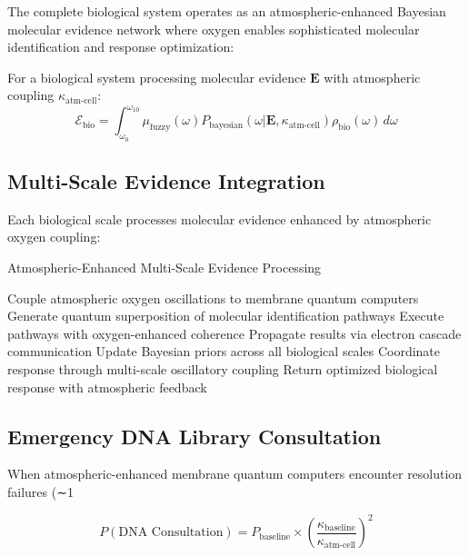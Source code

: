 \documentclass[twocolumn]{article}
\begin{document}
The complete biological system operates as an atmospheric-enhanced Bayesian molecular evidence network where oxygen enables sophisticated molecular identification and response optimization:

\begin{definition}
For a biological system processing molecular evidence $\mathbf{E}$ with atmospheric coupling $\kappa_{\text{atm-cell}}$:
\begin{equation}
\mathcal{E}_{\text{bio}} = \int_{\omega_0}^{\omega_{10}} \mu_{\text{fuzzy}}(\omega) P_{\text{bayesian}}(\omega | \mathbf{E}, \kappa_{\text{atm-cell}}) \rho_{\text{bio}}(\omega) \, d\omega
\end{equation}
\end{definition}

\subsection{Multi-Scale Evidence Integration}

Each biological scale processes molecular evidence enhanced by atmospheric oxygen coupling:

\begin{algorithm}
\caption{Atmospheric-Enhanced Multi-Scale Evidence Processing}
\begin{algorithmic}
    \State Couple atmospheric oxygen oscillations to membrane quantum computers
    \State Generate quantum superposition of molecular identification pathways
    \State Execute pathways with oxygen-enhanced coherence
    \State Propagate results via electron cascade communication
    \State Update Bayesian priors across all biological scales
    \State Coordinate response through multi-scale oscillatory coupling
    \State Return optimized biological response with atmospheric feedback
\EndProcedure
\end{algorithmic}
\end{algorithm}

\subsection{Emergency DNA Library Consultation}

When atmospheric-enhanced membrane quantum computers encounter resolution failures (∼1%

\begin{equation}
P(\text{DNA Consultation}) = P_{\text{baseline}} \times \left(\frac{\kappa_{\text{baseline}}}{\kappa_{\text{atm-cell}}}\right)^2
\end{equation}
\end{document}
